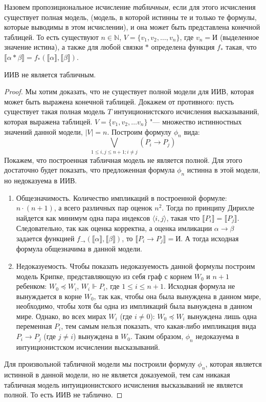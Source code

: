 \begin{definition}Назовем пропозициональное исчисление \emph{табличным}, если для этого исчисления 
существует полная модель, (модель, в которой истинны те и только те формулы, которые выводимы 
в этом исчислении), и она может быть представлена конечной таблицей. То есть существуют $n \in \mathbb{N}$,
$V = \{v_1, v_2, \dots, v_n\}$, где $v_n = \texttt{И}$ (выделенное значение истина), а также для любой связки $\ast$ определена функция $f_{\ast}$ такая, что $\llbracket \alpha \ast \beta \rrbracket = f_{\ast}(\llbracket \alpha \rrbracket, \llbracket \beta \rrbracket)$.
\end{definition}

\begin{theorem}
ИИВ не является табличным.
\end{theorem}
\begin{proof}
Мы хотим доказать, что не существует полной модели для ИИВ, которая может быть выражена конечной таблицей. 
Докажем от противного: пусть существует такая полная модель $T$ интуиционистского исчисления высказываний, которая выражена таблицей. 
$V = \{v_1, v_2, \dots v_n\}$ "--- множество истинностных значений данной модели, $|V| = n$.
Построим формулу $\phi_n$ вида: 
$$\bigvee_{1 \leq i,j \leq n + 1; i \ne j} (P_i \to P_j)$$
Покажем, что построенная табличная модель не является полной. Для этого
достаточно будет показать, что предложенная формула $\phi_n$ истинна в этой модели, но недоказуема в ИИВ.
\begin{enumerate}
\item Общезначимость. Количество импликаций в построенной формуле: $n\cdot(n + 1)$, а всего различных 
пар оценок $n^2$. Тогда по принципу Дирихле найдется как минимум одна пара индексов  
$\langle i , j\rangle$, такая что  $\llbracket P_i \rrbracket = \llbracket P_j \rrbracket $.
Следовательно, так как оценка корректна, а оценка имликации $\alpha \rightarrow \beta$ задается функцией $f_{\rightarrow}(\llbracket \alpha \rrbracket, \llbracket \beta \rrbracket)$, то $\llbracket P_i  \rightarrow  P_j \rrbracket = \texttt{И}$.
А тогда исходная формула общезначима в данной модели.
\item Недоказуемость. Чтобы показать недоказуемость данной формулы построим модель Крипке, представляющую
из себя граф с корнем $W_0$ и $n + 1$ ребенком: $W_0 \preceq W_i$,  $W_i \Vdash P_{i}$, где $1 \leq i \leq n + 1 $.
Исходная формула не вынуждается в корне $W_0$, так как, чтобы она была вынуждена в данном мире, необходимо, чтобы 
хотя бы одна из импликаций была вынуждена в данном мире. Однако, во всех мирах $W_i$ (где $ i \ne 0$): $W_0 \preceq W_i$ вынуждена
лишь одна переменная $P_{i}$, тем самым нельзя показать, что какая-либо импликация вида $P_{i} \rightarrow P_j$ (где $j \ne i$)  
вынуждена в $W_0$. Таким образом, $\phi_n$ недоказуема в интуиционистском исчислении высказываний.
\end{enumerate}
 Для произвольной табличной модели мы построили формулу $\phi_n$, которая является истинной в данной модели, но не является доказуемой, тем сам никакая табличная модель интуиционистского исчисления высказываний не является полной. То есть ИИВ не таблично.
\end{proof}